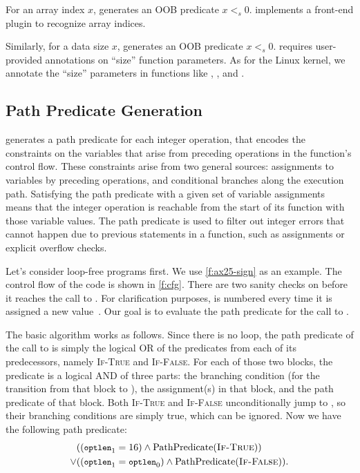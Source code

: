 For an array index $x$, \sys generates an OOB predicate $x <_s 0$.
\sys implements a front-end plugin to recognize array indices.

Similarly, for a data size $x$, \sys generates an OOB predicate $x <_s 0$.
\sys requires user-provided annotations on ``size'' function parameters.  As for
the Linux kernel, we annotate the ``size'' parameters in functions like ,
, and .

\subsection{Path Predicate Generation}
\label{s:gen:path}

\sys generates a path predicate for each integer operation, that encodes
the constraints on the variables that arise from preceding operations
in the function's control flow.  These constraints arise from two general
sources: assignments to variables by preceding operations, and conditional
branches along the execution path.  Satisfying the path predicate with
a given set of variable assignments means that the integer operation is
reachable from the start of its function with those variable values.
The path predicate is used to filter out integer errors that cannot
happen due to previous statements in a function, such as assignments or
explicit overflow checks.

Let's consider loop-free programs first.
%
We use \autoref{f:ax25-sign} as an example.  The control flow of
the code is shown in \autoref{f:cfg}.  There are two sanity checks
on  before it reaches the call to .
For clarification purposes,  is numbered every time it is
assigned a new value~\cite[\chapterautorefname~8.11]{whale}.  Our
goal is to evaluate the path predicate for the call to .

The basic algorithm works as follows.  Since there is no loop, the
path predicate of the call to  is simply the
logical OR of the predicates from each of its predecessors, namely
\textsc{If-True} and \textsc{If-False}.  For each of those two blocks,
the predicate is a logical AND of three parts: the branching condition
(for the transition from that block to ), the
assignment(s) in that block, and the path predicate
of that block.  Both \textsc{If-True} and \textsc{If-False}
unconditionally jump to , so their branching
conditions are simply true, which can be ignored.  Now we have the
following path predicate:
\newcommand{\optlen}{{\small \texttt{optlen}}}
\newcommand{\pc}{\textrm{PathPredicate}}
%
\begin{align*}
& ((\optlen_1 = 16) \land \pc(\textsc{If-True})) \\
\lor & ((\optlen_1 = \optlen_0) \land \pc(\textsc{If-False})).
\end{align*}


